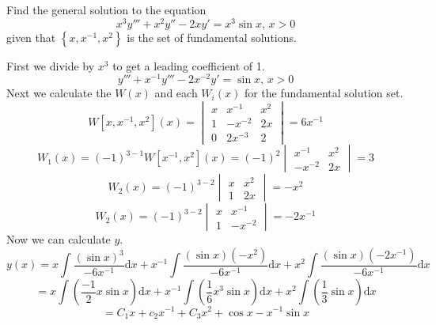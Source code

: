 \begin{example}
	Find the general solution to the equation
	\begin{equation*}
		x^3y''' + x^2y'' - 2xy' = x^3\sin{x} \text{, } x > 0
	\end{equation*}
	given that $\left\{x, x^{-1}, x^2\right\}$ is the set of fundamental solutions.
\end{example}
\noindent
First we divide by $x^3$ to get a leading coefficient of 1.
\begin{equation*}
	y''' + x^{-1}y''' - 2x^{-2}y' = \sin{x} \text{, } x > 0
\end{equation*}
Next we calculate the $W(x)$ and each $W_i(x)$ for the fundamental solution set.
\begin{equation*}
	W[x,x^{-1}, x^2](x) = \begin{vmatrix}
		x & x^{-1} & x^2 \\
		1 & -x^{-2} & 2x \\
		0 & 2x^{-3} & 2
	\end{vmatrix} = 6x^{-1}
\end{equation*}
\begin{equation*}
	W_1(x) = (-1)^{3-1}W[x^{-1}, x^2](x) = (-1)^{2}\begin{vmatrix}
		x^{-1} & x^2 \\
		-x^{-2} & 2x
	\end{vmatrix} = 3
\end{equation*}
\begin{equation*}
	W_2(x) = (-1)^{3-2}\begin{vmatrix}
		x & x^{2} \\
		1 & 2x
	\end{vmatrix} = -x^2
\end{equation*}
\begin{equation*}
	W_2(x) = (-1)^{3-2}\begin{vmatrix}
		x & x^{-1} \\
		1 & -x^{-2}
	\end{vmatrix} = -2x^{-1}
\end{equation*}
Now we can calculate $y$.
\begin{equation*}
	y(x) = x\int{\frac{(\sin{x})^3}{-6x^{-1}} \mathrm{d}x} + x^{-1}\int{\frac{(\sin{x})(-x^2)}{-6x^{-1}} \mathrm{d}x} + x^2\int{\frac{(\sin{x})(-2x^{-1})}{-6x^{-1}} \mathrm{d}x}
\end{equation*}
\begin{equation*}
	= x\int{\left(\frac{-1}{2}x\sin{x}\right)\mathrm{d}x} + x^{-1}\int{\left(\frac{1}{6}x^3\sin{x}\right)\mathrm{d}x} + x^2\int{\left(\frac{1}{3}\sin{x}\right)\mathrm{d}x}
\end{equation*}
\begin{equation*}
	= C_1x + c_2x^{-1} + C_3x^2 + \cos{x} - x^{-1}\sin{x}
\end{equation*}